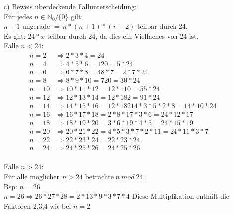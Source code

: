 \documentclass[paper = a4, ngerman]{scrartcl}
\begin{document}
\begin{itemize}
			\item[c)]
			Beweis überdeckende Fallunterscheidung:\\
			Für jedes $n \in \mathbb{N}_0 / \{ 0 \}$ gilt:\\
			$n+1$ ungerade $\Rightarrow n*(n+1)*(n+2)$ teilbar durch 24.\\
			Es gilt: $24*x$ teilbar durch 24, da dies ein Vielfaches von 24 ist.\\
			Fälle $n<24$:
			\begin{align*}
				n=2 &\Rightarrow 2*3*4 = 24\\
				n=4 &\Rightarrow 4*5*6 = 120 = 5*24\\
				n=6 &\Rightarrow 6*7*8 = 48*7 = 2*7*24\\
				n=8 &\Rightarrow 8*9*10 = 720 = 30*24\\
				n=10 &\Rightarrow 10*11*12 = 12*110 = 55*24\\
				n=12 &\Rightarrow 12*13*14 = 12*182 = 91*24\\
				n=14 &\Rightarrow 14*15*16 = 12*18214*3*5*2*8 = 14*10*24\\
				n=16 &\Rightarrow 16*17*18 = 2*8*17*3*6 = 24*12*17\\
				n=18 &\Rightarrow 18*19*20 = 3*6*19*4*5 = 24*15*19\\
				n=20 &\Rightarrow 20*21*22 = 4*5*3*7*2*11 = 24*11*3*7\\
				n=22 &\Rightarrow 22*23*24 = 22*23*24\\
				n=24 &\Rightarrow 24*25*26 = 24*25*26\\
			\end{align*}
			
			Fälle $n>24$:\\
				Für alle möglichen $n>24$ betrachte $n\ mod\ 24$.\\
				Bsp: $n=26$\\
				$n=26 \Rightarrow 26*27*28 = 2*13*9*3*7*4$
				Diese Multiplikation enthält die Faktoren 2,3,4 wie bei $n=2$
		\end{itemize}
\pagebreak
\end{document}
